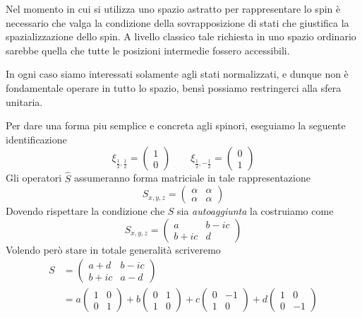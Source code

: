 Nel momento in cui si utilizza uno spazio astratto per rappresentare lo
spin è necessario che valga la condizione della sovrapposizione di stati
che giustifica la spazializzazione dello spin.
A livello classico tale
richiesta in uno spazio ordinario sarebbe quella che tutte le posizioni
intermedie fossero accessibili.

In ogni caso siamo interessati solamente agli stati normalizzati, e
dunque non è fondamentale operare in tutto lo spazio, bensì possiamo
restringerci alla sfera unitaria.

Per dare una forma piu semplice e concreta agli spinori, eseguiamo la
seguente identificazione \[
                             \xi_{\frac{1}{2}, \frac{1}{2}} =
                             \begin{pmatrix}
                                 1 \\ 0
                             \end{pmatrix} \qquad
                             \xi_{\frac{1}{2}, - \frac{1}{2}} =
                             \begin{pmatrix}
                                 0 \\ 1
                             \end{pmatrix}
\] Gli operatori \(\hat{S}\) assumeranno forma matriciale in tale
rappresentazione \[
                     S_{x,y,z} =
                     \begin{pmatrix}
                         \alpha & \alpha \\
                         \alpha & \alpha
                     \end{pmatrix}
\] Dovendo rispettare la condizione che \(S\) sia \emph{autoaggiunta} la
costruiamo come \[
                    S_{x,y,z} =
                    \begin{pmatrix}
                        a      & b - ic \\
                        b + ic & d
                    \end{pmatrix}
\] Volendo però stare in totale generalità scriveremo
\begin{align*}
    S & =
    \begin{pmatrix}
        a + d & b-ic \\
        b+ic  & a-d
    \end{pmatrix} \\
    & =
    a
    \begin{pmatrix}
        1 & 0 \\
        0 & 1
    \end{pmatrix}
    + b \begin{pmatrix}
            0 & 1 \\
            1 & 0
    \end{pmatrix}
    + c \begin{pmatrix}
            0 & -1 \\
            1 & 0
    \end{pmatrix}
    +d \begin{pmatrix}
           1 & 0  \\
           0 & -1
    \end{pmatrix}
\end{align*}

